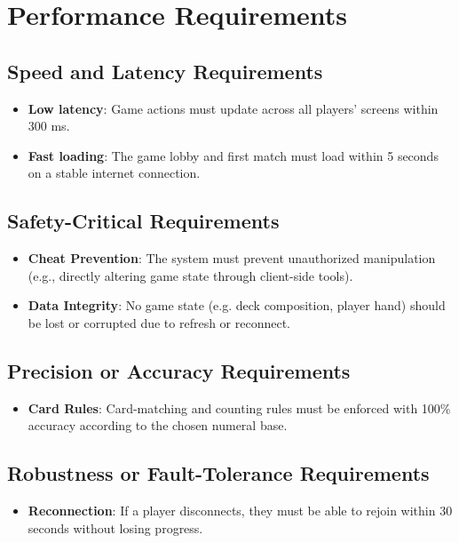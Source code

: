 \documentclass[12pt]{article}
\begin{document}
\section{Performance Requirements}
\subsection{Speed and Latency Requirements}
	\begin{itemize}
		\item\textbf{Low latency}: Game actions must update across all players’ screens within 300 ms.
		\item \textbf{Fast loading}: The game lobby and first match must load within 5 seconds on a stable internet connection.
	\end{itemize}

\subsection{Safety-Critical Requirements}
	\begin{itemize}
		\item\textbf{Cheat Prevention}: The system must prevent unauthorized manipulation (e.g., directly altering game state through client-side tools).
		\item \textbf{Data Integrity}: No game state (e.g. deck composition, player hand) should be lost or corrupted due to refresh or reconnect.
	\end{itemize}

\subsection{Precision or Accuracy Requirements}
	\begin{itemize}
		\item\textbf{Card Rules}: Card-matching and counting rules must be enforced with 100\% accuracy according to the chosen numeral base.
	\end{itemize}

\subsection{Robustness or Fault-Tolerance Requirements}
	\begin{itemize}
		\item\textbf{Reconnection}: If a player disconnects, they must be able to rejoin within 30 seconds without losing progress.
	\end{itemize}
\end{document}

